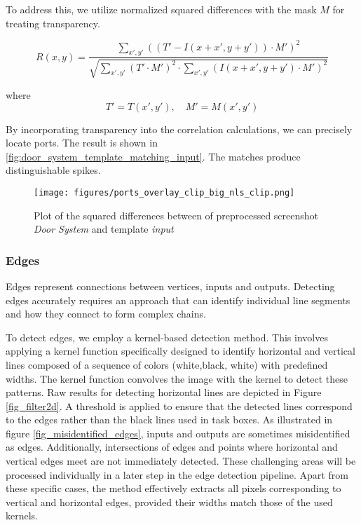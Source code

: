 To address this, we utilize normalized squared differences with the mask $M$ for treating transparency.


\begin{equation}
    R(x, y) = \frac{\sum_{x', y'} \left( \left( T' - I(x + x', y + y') \right)  \cdot M' \right)^2}
{\sqrt{\sum_{x', y'} \left( T'  \cdot M'\right)^2 
\cdot \sum_{x', y'} \left(  I(x + x', y + y') \cdot M'     \right)^2
 }}
\end{equation}

where
\begin{equation*}
T' = T(x', y'), \quad M' = M(x', y')    
\end{equation*}



By incorporating transparency into the correlation calculations, we can precisely locate ports. 
The result is shown in \autoref{fig:door_system_template_matching_input}. The matches produce distinguishable spikes. 

\begin{figure}[htb]
  \centering
  \texttt{[image: figures/ports\_overlay\_clip\_big\_nls\_clip.png]}
  \caption{Plot of the squared differences between of preprocessed screenshot \emph{Door System} and template \emph{input}}
  \label{fig:door_system_template_matching_input}
\end{figure}

\subsubsection{Edges}
Edges represent connections between vertices, inputs and outputs. Detecting edges accurately requires an approach that can identify individual line segments and how they connect to form complex chains.

To detect edges, we employ a kernel-based detection method. This involves applying a kernel function specifically designed to identify horizontal and vertical lines composed of a sequence of colors (white,black, white) with predefined widths. The kernel function convolves the image with the kernel to detect these patterns.
Raw results for detecting horizontal lines are depicted in Figure \ref{fig_filter2d}.
A threshold is applied to ensure that the detected lines correspond to the edges rather than the black lines used in task boxes.
As illustrated in figure \ref{fig_misidentified_edges}, inputs and outputs are sometimes misidentified as edges. Additionally, intersections of edges and points where horizontal and vertical edges meet are not immediately detected. These challenging areas will be processed individually in a later step in the edge detection pipeline. Apart from these specific cases, the method effectively extracts all pixels corresponding to vertical and horizontal edges, provided their widths match those of the used kernels.


